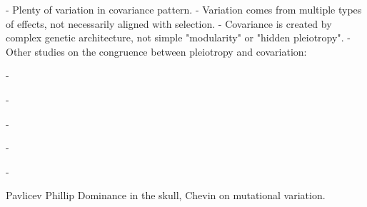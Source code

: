 \begin{refsection}
- Plenty of variation in covariance pattern.
- Variation comes from multiple types of effects, not necessarily aligned with selection. 
- Covariance is created by complex genetic architecture, not simple "modularity" or "hidden pleiotropy".
- Other studies on the congruence between pleiotropy and covariation: 

- \parencite{Porto2016-qc} 

- \parencite{Leamy2002-nh}

- \parencite{Kenney-Hunt2008-bd}

- \parencite{Jones2014-wj}

- \parencite{Chebib2017-sv}

Pavlicev Phillip Dominance in the skull, Chevin on mutational variation.

\printbibliography

\end{refsection}